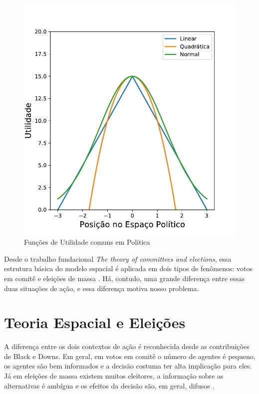 \begin{figure}[H]
  \centering \includegraphics[scale = 0.6]{ims/utilities.pdf}
  \caption{Funções de Utilidade comuns em Política}
\end{figure}

Desde o trabalho fundacional \textit{The theory of committees and
  elections}\cite{black1958theory}, essa estrutura básica do modelo espacial é
aplicada em dois tipos de fenômenos: votos em comitê e eleições de massa
\cite{munger2015choosing}. Há, contudo, uma grande diferença entre essas duas
situações de ação, e essa diferença motiva nosso problema.


\section{Teoria Espacial e Eleições}


A diferença entre os dois contextos de ação é reconhecida desde as contribuições
de Black e Downs. Em geral, em votos em comitê o número de agentes é pequeno, os
agentes são bem informados e a decisão costuma ter alta implicação para eles. Já
em eleições de massa existem muitos eleitores, a informação sobre as
alternativas é ambígua e os efeitos da decisão são, em geral, difusos
\cite{munger2015choosing}.

